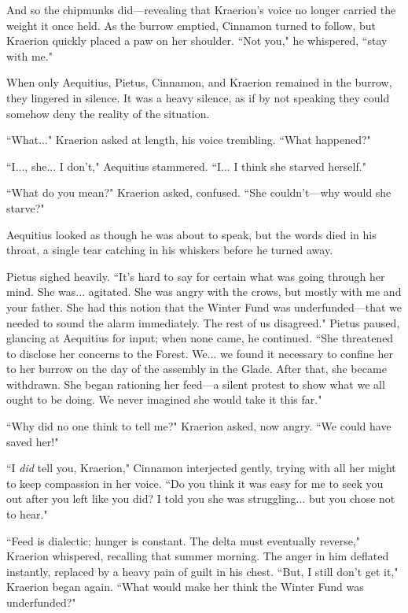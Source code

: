 And so the chipmunks did---revealing that Kraerion's voice no longer carried the weight it once held.
As the burrow emptied, Cinnamon turned to follow, but Kraerion quickly placed a paw on her shoulder.
``Not you," he whispered, ``stay with me."

When only Aequitius, Pietus, Cinnamon, and Kraerion remained in the burrow, they lingered in silence.
It was a heavy silence, as if by not speaking they could somehow deny the reality of the situation.

``What..." Kraerion asked at length, his voice trembling. ``What happened?"

``I..., she... I don't," Aequitius stammered. ``I... I think she starved herself."

``What do you mean?" Kraerion asked, confused. ``She couldn't---why would she starve?"

Aequitius looked as though he was about to speak, but the words died in his throat, a single tear catching in his whiskers before he turned away.

Pietus sighed heavily. ``It's hard to say for certain what was going through her mind.
She was... agitated.
She was angry with the crows, but mostly with me and your father.
She had this notion that the Winter Fund was underfunded---that we needed to sound the alarm immediately.
The rest of us disagreed."
Pietus paused, glancing at Aequitius for input; when none came, he continued. ``She threatened to disclose her concerns to the Forest.
We... we found it necessary to confine her to her burrow on the day of the assembly in the Glade.
After that, she became withdrawn.
She began rationing her feed---a silent protest to show what we all ought to be doing.
We never imagined she would take it this far."

``Why did no one think to tell me?" Kraerion asked, now angry.
``We could have saved her!"

``I \textit{did} tell you, Kraerion," Cinnamon interjected gently, trying with all her might to keep compassion in her voice.
``Do you think it was easy for me to seek you out after you left like you did?
I told you she was struggling... but you chose not to hear."

``Feed is dialectic; hunger is constant.
The delta must eventually reverse," Kraerion whispered, recalling that summer morning.
The anger in him deflated instantly, replaced by a heavy pain of guilt in his chest.
``But, I still don't get it," Kraerion began again.
``What would make her think the Winter Fund was underfunded?"

